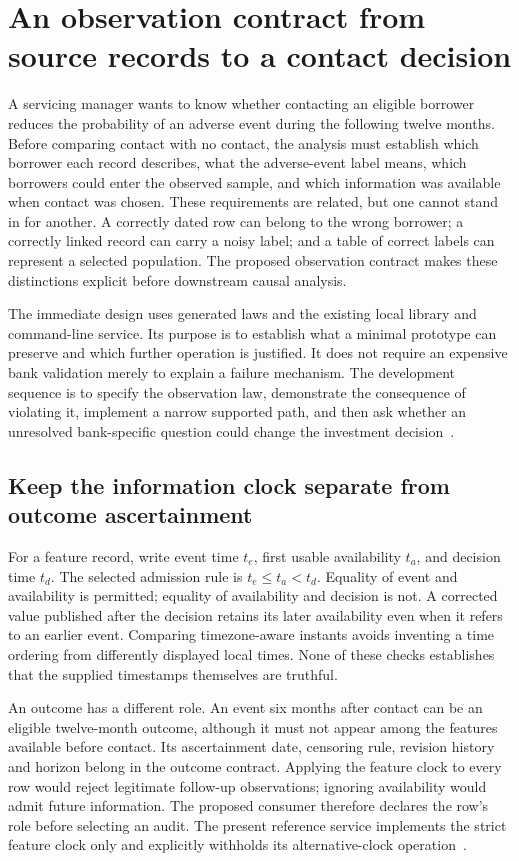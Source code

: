 \section{An observation contract from source records to a contact decision}
\label{exec13:observation-journey}

A servicing manager wants to know whether contacting an eligible borrower
reduces the probability of an adverse event during the following twelve
months. Before comparing contact with no contact, the analysis must establish
which borrower each record describes, what the adverse-event label means,
which borrowers could enter the observed sample, and which information was
available when contact was chosen. These requirements are related, but one
cannot stand in for another. A correctly dated row can belong to the wrong
borrower; a correctly linked record can carry a noisy label; and a table of
correct labels can represent a selected population. The proposed observation
contract makes these distinctions explicit before downstream causal analysis.

The immediate design uses generated laws and the existing local library and
command-line service. Its purpose is to establish what a minimal prototype
can preserve and which further operation is justified. It does not require
an expensive bank validation merely to explain a failure mechanism. The
development sequence is to specify the observation law, demonstrate the
consequence of violating it, implement a narrow supported path, and then ask
whether an unresolved bank-specific question could change the investment
decision~\citep{exec13_observation_design}.

\subsection{Keep the information clock separate from outcome ascertainment}

For a feature record, write event time $t_e$, first usable availability
$t_a$, and decision time $t_d$. The selected admission rule is
$t_e\leq t_a<t_d$. Equality of event and availability is permitted; equality
of availability and decision is not. A corrected value published after the
decision retains its later availability even when it refers to an earlier
event. Comparing timezone-aware instants avoids inventing a time ordering
from differently displayed local times. None of these checks establishes
that the supplied timestamps themselves are truthful.

An outcome has a different role. An event six months after contact can be
an eligible twelve-month outcome, although it must not appear among the
features available before contact. Its ascertainment date, censoring rule,
revision history and horizon belong in the outcome contract. Applying the
feature clock to every row would reject legitimate follow-up observations;
ignoring availability would admit future information. The proposed consumer
therefore declares the row's role before selecting an audit. The present
reference service implements the strict feature clock only and explicitly
withholds its alternative-clock operation~\citep{exec13_observation_primary}.

